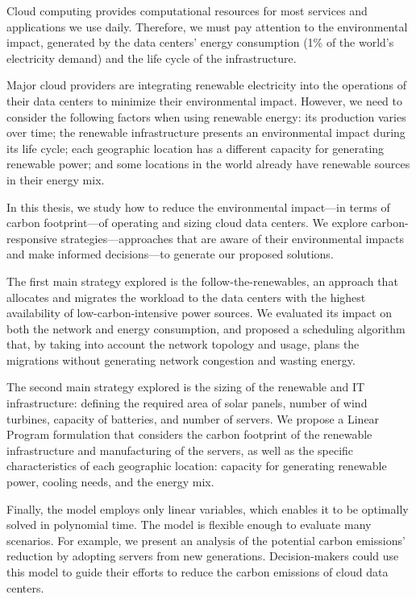 
Cloud computing provides computational resources for most services and applications we use daily. Therefore, we must pay attention to the environmental impact, generated by the data centers' energy consumption (1\% of the world's electricity demand) and the life cycle of the infrastructure.

Major cloud providers are integrating renewable electricity into the operations of their data centers to minimize their environmental impact. However, we need to consider the following factors when using renewable energy: its production varies over time; the renewable infrastructure presents an environmental impact during its life cycle; each geographic location has a different capacity for generating renewable power; and some locations in the world already have renewable sources in their energy mix.

In this thesis, we study how to reduce the environmental impact---in terms of carbon footprint---of operating and sizing cloud data centers. We explore carbon-responsive strategies---approaches that are aware of their environmental impacts and make informed decisions---to generate our proposed solutions.

The first main strategy explored is the follow-the-renewables, an approach that allocates and migrates the workload to the data centers with the highest availability of low-carbon-intensive power sources. We evaluated its impact on both the network and energy consumption, and proposed a scheduling algorithm that, by taking into account the network topology and usage, plans the migrations without generating network congestion and wasting energy.

The second main strategy explored is the sizing of the renewable and IT infrastructure: defining the required area of solar panels, number of wind turbines, capacity of batteries, and number of servers. We propose a Linear Program formulation that considers the carbon footprint of the renewable infrastructure and manufacturing of the servers, as well as the specific characteristics of each geographic location: capacity for generating renewable power, cooling needs, and the energy mix. 

Finally, the model employs only linear variables, which enables it to be optimally solved in polynomial time. The model is flexible enough to evaluate many scenarios. For example, we present an analysis of the potential carbon emissions' reduction by adopting servers from new generations. Decision-makers could use this model to guide their efforts to reduce the carbon emissions of cloud data centers. 